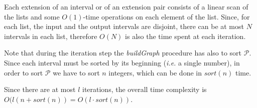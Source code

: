 \documentclass[runningheads,envcountsame,a4paper]{llncs}
\newcommand{\ie}{\textit{i.e.}\xspace}
\begin{document}
Each extension of an interval or of an extension pair consists of a linear scan
of the lists and some $O(1)$-time operations on each element of the list.
Since, for each list, the input and the output intervals are disjoint, there can
be at most $N$ intervals in each list, therefore $O(N)$ is also the time spent
at each iteration.


\begin{comment}
times the procedures ExtendQonLeft and ExtendQonRight.
In fact, those two procedures
apply the backward extension to every $Q$-interval in $\mathcal{Q}_j$ at
most $l$ times, since there can't be any interval related to a pattern
$Q$ such that $|Q| > l$. %

On the other hand the procedures ExtendQonLeft and ExtendQonRight aim to
build all the possible $Q$-intervals linked to the maximal overlaps
between the reads (the irreducible edges of the String Graph) by means of
an incremental approach that rely on the computation of the
$Q$-intervals during the previous steps.

Thus, the time complexity of these procedures may be measured by
considering the total number of possible $Q$-intervals that we have to
compute for every length of $Q$ (more precisely for $|Q| \in \{1 \dots
l\}$).

Then the total  complexity of ExtendQonLeft and ExtendQonRight is at
most $O(N_Q)$, where $N_Q$ is the total number of
$Q$-intervals (i.e. distinct substrings of $R$).

An estimate of $N_Q$ can be given as $O(l \times n)$ (let us recall that
the number of distinct strings in a word on length $x$ is  at most $x$
((Trovare articolo e citare)\cite{})).
\end{comment}

Note that during the iteration step the \emph{buildGraph} procedure has also to
sort $\mathcal{P}$. Since each interval must be sorted by its beginning (\ie a
single number), in order to sort  $\mathcal{P}$ we have to sort $n$ integers,
which can be done in $sort(n)$ time.

Since there are at most $l$ iterations, the overall time complexity is
$O(l (n + sort(n))=O(l \cdot sort(n))$.
\end{document}

